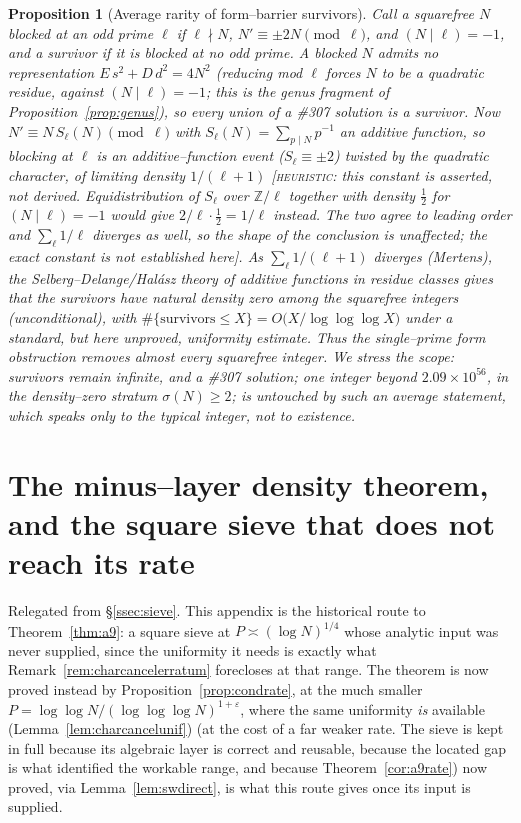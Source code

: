 \documentclass[11pt]{article}
\newtheorem{proposition}[theorem]{Proposition}
\theoremstyle{definition}
\begin{document}
\begin{proposition}[Average rarity of form--barrier survivors]\label{prop:survivors}
Call a squarefree $N$ \emph{blocked} at an odd prime $\ell$ if $\ell\nmid N$, $N'\equiv\pm2N\pmod\ell$, and
$(N\mid\ell)=-1$, and a \emph{survivor} if it is blocked at no odd prime. A blocked $N$ admits no
representation $E\,s^2+D\,d^2=4N^2$ (reducing mod $\ell$ forces $N$ to be a quadratic residue, against
$(N\mid\ell)=-1$; this is the genus fragment of Proposition~\ref{prop:genus}), so every union of a \#307
solution is a survivor. Now $N'\equiv N\,S_\ell(N)\pmod\ell$ with $S_\ell(N)=\sum_{p\mid N}p^{-1}$ an
\emph{additive} function, so blocking at $\ell$ is an additive--function event ($S_\ell\equiv\pm2$) twisted by
the quadratic character, of limiting density $1/(\ell+1)$ \textup{[}\textsc{heuristic}: this constant
is asserted, not derived. Equidistribution of $S_\ell$ over $\mathbb{Z}/\ell$ together with density
$\tfrac12$ for $(N\mid\ell)=-1$ would give $2/\ell\cdot\tfrac12=1/\ell$ instead. The two agree to
leading order and $\sum_\ell1/\ell$ diverges as well, so the shape of the conclusion is unaffected;
the exact constant is not established here\textup{]}. As $\sum_\ell1/(\ell+1)$ diverges (Mertens), the
Selberg--Delange/Halász theory of additive functions in residue classes \cite{Tenenbaum} gives that the
survivors have natural density zero among the squarefree integers (unconditional), with
$\#\{\text{survivors}\le X\}=O\!\bigl(X/\log\log\log X\bigr)$ under a standard, but here unproved,
uniformity estimate. Thus the single--prime form obstruction removes \emph{almost every} squarefree integer.
We stress the scope: survivors remain \emph{infinite}, and a \#307 solution; one integer beyond
$2.09\times10^{56}$, in the density--zero stratum $\sigma(N)\ge2$; is untouched by such an average
statement, which speaks only to the typical integer, not to existence.
\end{proposition}

\appendix

\section{The minus--layer density theorem, and the square sieve that does not reach its rate}\label{app:sieve}

Relegated from \S\ref{ssec:sieve}. This appendix is the historical route to
Theorem~\ref{thm:a9}: a square sieve at $P\asymp(\log N)^{1/4}$ whose analytic input was never
supplied, since the uniformity it needs is exactly what Remark~\ref{rem:charcancelerratum}
forecloses at that range. The theorem is now proved instead by
Proposition~\ref{prop:condrate}, at the much smaller $P=\log\log N/(\log\log\log N)^{1+\varepsilon}$, where the same
uniformity \emph{is} available (Lemma~\ref{lem:charcancelunif}) (at the cost of a far weaker rate.
The sieve is kept in full because its algebraic layer is correct and reusable, because the located
gap is what identified the workable range, and because Theorem~\ref{cor:a9rate}) now proved, via
Lemma~\ref{lem:swdirect}, is what this route gives once its input is supplied.
\end{document}
